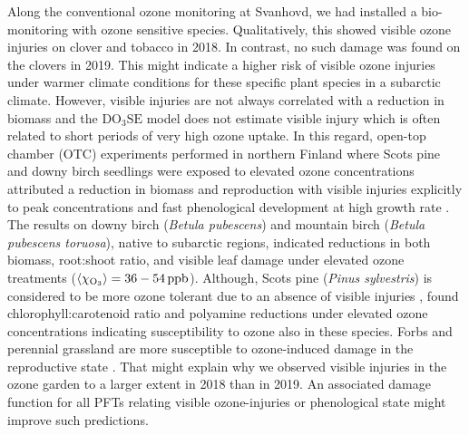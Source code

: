 \documentclass[bg, manuscript]{copernicus}
\begin{document}
Along the conventional ozone monitoring at Svanhovd, we had installed a bio-monitoring with ozone sensitive species. Qualitatively, this showed visible ozone injuries on clover and tobacco in 2018. In contrast, no such damage was found on the clovers in 2019. This might indicate a higher risk of visible ozone injuries under warmer climate conditions for these specific plant species in a subarctic climate. However, visible injuries are not always correlated with a reduction in biomass \citep[and citations therein]{CRG:Felzer2007} and the $\mathrm{DO_3SE}$ model does not estimate visible injury which is often related to short periods of very high ozone uptake. In this regard, open-top chamber (OTC) experiments performed in northern Finland where Scots pine and downy birch seedlings were exposed to elevated ozone concentrations attributed a reduction in biomass and reproduction with visible injuries explicitly to peak  concentrations and fast phenological development at high growth rate \citep{Amb:Manninen2009}. The \citet{Amb:Manninen2009} results on downy birch (\emph{Betula pubescens}) and mountain birch (\emph{Betula pubescens toruosa}), native to subarctic regions, indicated reductions in both biomass, root:shoot ratio, and visible leaf damage under elevated ozone treatments ($\left<\chem{\chi_{O_3}}\right> = 36-54\,\unit{ppb}$). Although, Scots pine (\emph{Pinus sylvestris}) is considered to be more ozone tolerant due to an absence of visible injuries \citep{Amb:Girgzdiene2009}, \citet{Amb:Manninen2009} found chlorophyll:carotenoid ratio and polyamine reductions under elevated ozone concentrations indicating susceptibility to ozone also in these species. Forbs and perennial grassland are more susceptible to ozone-induced damage in the reproductive state \citep{EP:Bassin2004}. 
That might explain why we observed visible injuries in the ozone garden to a larger extent in 2018 than in 2019. An associated damage function for all PFTs relating visible ozone-injuries or phenological state might improve such predictions.
\end{document}
